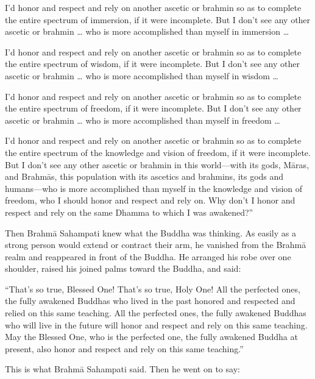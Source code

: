 \documentclass[12pt,openany]{book}%
\begin{document}
I’d honor and respect and rely on another ascetic or brahmin so as to complete the entire spectrum of immersion, if it were incomplete. But I don’t see any other ascetic or brahmin … who is more accomplished than myself in immersion … 

I’d honor and respect and rely on another ascetic or brahmin so as to complete the entire spectrum of wisdom, if it were incomplete. But I don’t see any other ascetic or brahmin … who is more accomplished than myself in wisdom … 

I’d honor and respect and rely on another ascetic or brahmin so as to complete the entire spectrum of freedom, if it were incomplete. But I don’t see any other ascetic or brahmin … who is more accomplished than myself in freedom … 

I’d honor and respect and rely on another ascetic or brahmin so as to complete the entire spectrum of the knowledge and vision of freedom, if it were incomplete. But I don’t see any other ascetic or brahmin in this world—with its gods, \textsanskrit{Māras}, and \textsanskrit{Brahmās}, this population with its ascetics and brahmins, its gods and humans—who is more accomplished than myself in the knowledge and vision of freedom, who I should honor and respect and rely on. Why don’t I honor and respect and rely on the same Dhamma to which I was awakened?” 

Then \textsanskrit{Brahmā} Sahampati knew what the Buddha was thinking. As easily as a strong person would extend or contract their arm, he vanished from the \textsanskrit{Brahmā} realm and reappeared in front of the Buddha. He arranged his robe over one shoulder, raised his joined palms toward the Buddha, and said: 

“That’s so true, Blessed One! That’s so true, Holy One! All the perfected ones, the fully awakened Buddhas who lived in the past honored and respected and relied on this same teaching. All the perfected ones, the fully awakened Buddhas who will live in the future will honor and respect and rely on this same teaching. May the Blessed One, who is the perfected one, the fully awakened Buddha at present, also honor and respect and rely on this same teaching.” 

This is what \textsanskrit{Brahmā} Sahampati said. Then he went on to say: 
\end{document}
